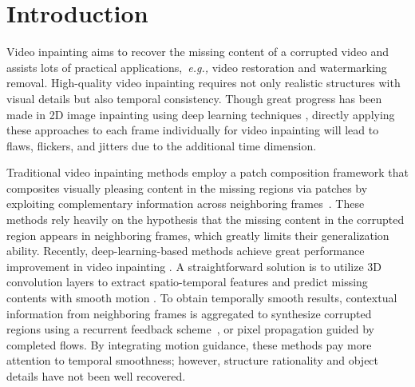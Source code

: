 

\section{Introduction}


Video inpainting aims to recover the missing content of a corrupted video and assists lots of practical applications,~\emph{e.g.,} video restoration and watermarking removal. 
High-quality video inpainting requires not only realistic structures with visual details but also temporal consistency. 
% 
Though great progress has been made in 2D image inpainting using deep learning techniques \cite{yu2018free,Xiong_2019_CVPR,wang2018high}, directly applying these approaches to each frame individually for video inpainting will lead to flaws, flickers, and jitters due to the additional time dimension. 





Traditional video inpainting methods employ a patch composition framework that composites visually pleasing content in the missing regions via patches by exploiting complementary information across neighboring frames~\cite{patwardhan2007video,wexler2004space,newson2014video}.
% 
These methods rely heavily on the hypothesis that the missing content in the corrupted region appears in neighboring frames, which greatly limits their generalization ability.
%
Recently, deep-learning-based methods achieve great performance improvement in video inpainting \cite{wang2019video,Kim_2019_CVPR1,Xu_2019_CVPR,Kim_2019_CVPR}.
A straightforward solution is to utilize 3D convolution layers to extract spatio-temporal features and predict missing contents with smooth motion \cite{wang2019video}.
To obtain temporally smooth results, contextual information from neighboring frames is aggregated to synthesize corrupted regions using a recurrent feedback scheme~\cite{Kim_2019_CVPR1,Kim_2019_CVPR}, or pixel propagation guided by completed flows. 
By integrating motion guidance, these methods pay more attention to temporal smoothness; however, structure rationality and object details have not been well recovered. 


